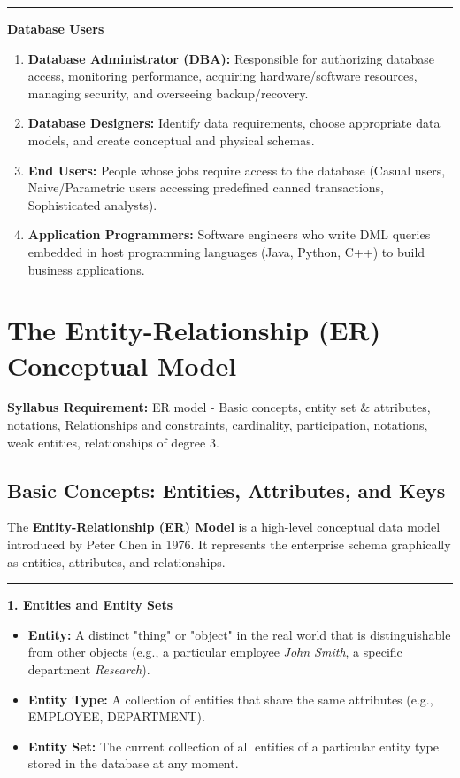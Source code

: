\documentclass[11pt,a4paper]{article}
\newcommand{\ic}[1]{\mbox{\colorbox{AnthCodeBG}{\footnotesize\ttfamily\textcolor{AnthBlue}{#1}}}}
\newcommand{\concept}[1]{%
  \vspace{3pt}\noindent\textcolor{AnthGreen}{\rule{3.5pt}{10pt}}\enspace
  \textbf{\sffamily\color{AnthDark}#1}\par\vspace{2pt}%
}
\newcommand{\syllabusitem}[1]{%
  \begin{tcolorbox}[enhanced, colback=AnthOrange!8, colframe=AnthOrange, boxrule=0.4pt, arc=3pt, left=7pt, right=7pt, top=3pt, bottom=3pt]
    \small\sffamily\textbf{\color{AnthOrange}Syllabus Requirement:} #1
  \end{tcolorbox}
}
\begin{document}
\concept{Database Users}
\begin{enumerate}
  \item \textbf{Database Administrator (DBA):} Responsible for authorizing database access, monitoring performance, acquiring hardware/software resources, managing security, and overseeing backup/recovery.
  \item \textbf{Database Designers:} Identify data requirements, choose appropriate data models, and create conceptual and physical schemas.
  \item \textbf{End Users:} People whose jobs require access to the database (Casual users, Naive/Parametric users accessing predefined canned transactions, Sophisticated analysts).
  \item \textbf{Application Programmers:} Software engineers who write DML queries embedded in host programming languages (Java, Python, C++) to build business applications.
\end{enumerate}

\clearpage
\section{The Entity-Relationship (ER) Conceptual Model}

\syllabusitem{ER model - Basic concepts, entity set \& attributes, notations, Relationships and constraints, cardinality, participation, notations, weak entities, relationships of degree 3.}

\subsection{Basic Concepts: Entities, Attributes, and Keys}

The \textbf{Entity-Relationship (ER) Model} is a high-level conceptual data model introduced by Peter Chen in 1976. It represents the enterprise schema graphically as entities, attributes, and relationships.

\concept{1. Entities and Entity Sets}
\begin{itemize}
  \item \textbf{Entity:} A distinct "thing" or "object" in the real world that is distinguishable from other objects (e.g., a particular employee \emph{John Smith}, a specific department \emph{Research}).
  \item \textbf{Entity Type:} A collection of entities that share the same attributes (e.g., \ic{EMPLOYEE}, \ic{DEPARTMENT}).
  \item \textbf{Entity Set:} The current collection of all entities of a particular entity type stored in the database at any moment.
\end{itemize}
\end{document}
